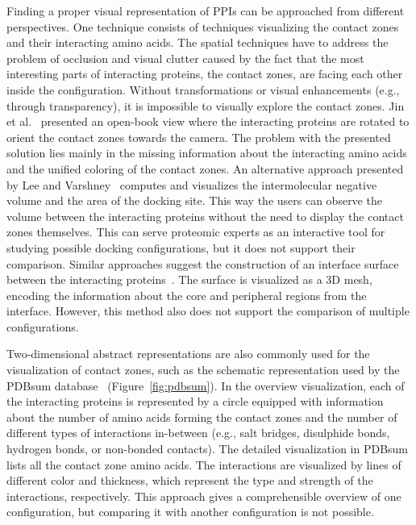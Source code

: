 \documentclass[twocolumn]{bmcart}%
\begin{document}
Finding a proper visual representation of PPIs can be approached from different perspectives. 
One technique consists of techniques visualizing the contact zones and their interacting amino acids.
The spatial techniques have to address the problem of occlusion and visual clutter caused by the fact that the most interesting parts of interacting proteins, the contact zones, are facing each other inside the configuration.
Without transformations or visual enhancements (e.g., through transparency), it is impossible to visually explore the contact zones.
Jin et al.~\cite{Jin2014} presented an open-book view where the interacting proteins are rotated to orient the contact zones towards the camera.
The problem with the presented solution lies mainly in the missing information about the interacting amino acids and the unified coloring of the contact zones.
An alternative approach presented by Lee and Varshney~\cite{Varshney2003} computes and visualizes the intermolecular negative volume and the area of the docking site. %
This way the users can observe the volume between the interacting proteins without the need to display the contact zones themselves.
This can serve proteomic experts as an interactive tool for studying possible docking configurations, but it does not support their comparison.
Similar approaches suggest the construction of an interface surface between the interacting proteins~\cite{480793, Ban2006}.
The surface is visualized as a 3D mesh, encoding the information about the core and peripheral regions from the interface. 
However, this method also does not support the comparison of multiple configurations.

Two-dimensional abstract representations are also commonly used for the visualization of contact zones, such as the schematic representation used by the PDBsum database~\cite{pdbsum} (Figure~\ref{fig:pdbsum}).
In the overview visualization, each of the interacting proteins is represented by a circle equipped with information about the number of amino acids forming the contact zones and the number of different types of interactions in-between (e.g., salt bridges, disulphide bonds, hydrogen bonds, or non-bonded contacts).
The detailed visualization in PDBsum lists all the contact zone amino acids. 
The interactions are visualized by lines of different color and thickness, which represent the type and strength of the interactions, respectively. 
This approach gives a comprehensible overview of one configuration, but comparing it with another configuration is not possible.
\end{document}
